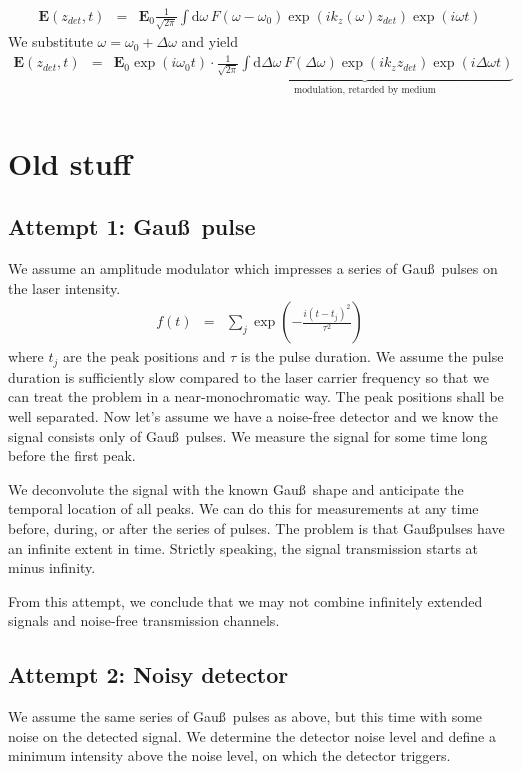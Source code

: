 \documentclass[12pt,a4paper,twoside,openright,BCOR10mm,headsepline,titlepage,abstracton,chapterprefix,final]{scrreprt}
\newcommand\Vector[1]{{\mathbf{#1}}}
\newcommand\wavenumber{k}
\newcommand\scalarEfield{E}
\newcommand\Efield{\Vector{\scalarEfield}}
\newcommand\totald{\textrm{d}}
\begin{document}
\begin{eqnarray}
\Efield(z_{det}, t) &=& 
  \Efield_0 
  \frac{1}{\sqrt{2\pi}} \int \totald\omega\, 
  F(\omega-\omega_0)
  \exp (i \wavenumber_z(\omega) z_{det})
  \exp ( i \omega t)
\end{eqnarray}
We substitute $\omega = \omega_0 + \Delta \omega$ and yield
\begin{eqnarray}
\Efield(z_{det}, t) &=& 
  \Efield_0 \exp ( i \omega_0 t)
  \cdot
  \underbrace{
      \frac{1}{\sqrt{2\pi}} \int \totald\Delta\omega\, 
      F(\Delta \omega)
      \exp (i \wavenumber_z z_{det})
      \exp ( i \Delta \omega t)
      }_{\textrm{modulation, retarded by medium}}
\nonumber\\
\end{eqnarray}

\section{Old stuff}
\subsection{Attempt 1: Gau\ss\, pulse}
We assume an amplitude modulator which impresses a series of Gau\ss\, pulses on the laser intensity.
\begin{eqnarray}
  f(t) &=& \sum_j \exp\left(- \frac{i(t-t_j)^2}{\tau^2}\right) 
\end{eqnarray}
where $t_j$ are the peak positions and $\tau$ is the pulse duration.
We assume the pulse duration is sufficiently slow compared to the laser carrier frequency 
so that we can treat the problem in a near-monochromatic way.
The peak positions shall be well separated.
Now let's assume we have a noise-free detector and we know the signal consists only of Gau\ss\, pulses.
We measure the signal for some time long before the first peak.

We deconvolute the signal with the known Gau\ss\, shape and anticipate the temporal location of all peaks.
We can do this for measurements at any time before, during, or after the series of pulses.
The problem is that Gau\ss pulses have an infinite extent in time.
Strictly speaking, the signal transmission starts at minus infinity.

From this attempt, we conclude that we may not combine infinitely extended signals and noise-free transmission channels.

\subsection{Attempt 2: Noisy detector}
We assume the same series of Gau\ss\, pulses as above, but this time with some noise on the detected signal.
We determine the detector noise level and define a minimum intensity above the noise level, on which the detector triggers.
\end{document}
